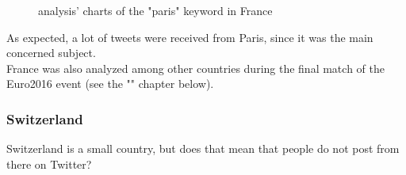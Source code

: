 \documentclass[a4paper,11pt]{report}
\begin{document}
\begin{figure}[H]
\vspace{-5pt}
\begin{center}
\vspace{-20pt}
\caption{analysis' charts of the "paris" keyword in France}
\end{center}
\end{figure}
\vspace{-10pt}

As expected, a lot of tweets were received from Paris, since it was the main concerned subject.\\

France was also analyzed among other countries during the final match of the Euro2016 event (see the "" chapter below).

\subsubsection{Switzerland}
Switzerland is a small country, but does that mean that people do not post from there on Twitter?\\
\end{document}
